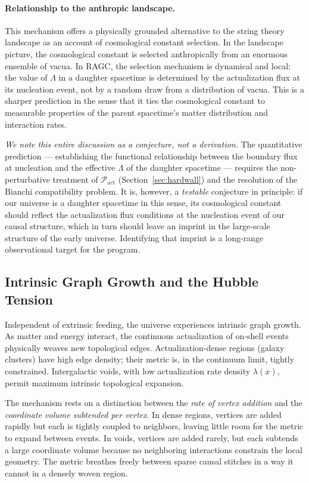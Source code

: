 \documentclass[11pt,a4paper]{article}
\theoremstyle{plain}
\theoremstyle{definition}
\theoremstyle{remark}
\newcommand{\Pact}{\mathcal{P}_{\mathrm{act}}}
\begin{document}
\paragraph{Relationship to the anthropic landscape.}
This mechanism offers a physically grounded alternative to the string theory
landscape as an account of cosmological constant selection. In the landscape
picture, the cosmological constant is selected anthropically from an enormous
ensemble of vacua. In RAGC, the selection mechanism is dynamical and local: the
value of $\Lambda$ in a daughter spacetime is determined by the actualization flux
at its nucleation event, not by a random draw from a distribution of vacua. This
is a sharper prediction in the sense that it ties the cosmological constant to
measurable properties of the parent spacetime's matter distribution and interaction
rates.

\emph{We note this entire discussion as a conjecture, not a derivation.} The
quantitative prediction --- establishing the functional relationship between the
boundary flux at nucleation and the effective $\Lambda$ of the daughter spacetime
--- requires the non-perturbative treatment of $\Pact$ (Section~\ref{sec:hardwall})
and the resolution of the Bianchi compatibility problem. It is, however, a
\emph{testable} conjecture in principle: if our universe is a daughter spacetime
in this sense, its cosmological constant should reflect the actualization flux
conditions at the nucleation event of our causal structure, which in turn should
leave an imprint in the large-scale structure of the early universe. Identifying
that imprint is a long-range observational target for the program.

\subsection{Intrinsic Graph Growth and the Hubble Tension}

Independent of extrinsic feeding, the universe experiences intrinsic graph growth.
As matter and energy interact, the continuous actualization of on-shell events
physically weaves new topological edges. Actualization-dense regions (galaxy
clusters) have high edge density; their metric is, in the continuum limit, tightly
constrained. Intergalactic voids, with low actualization rate density $\lambda(x)$,
permit maximum intrinsic topological expansion.

The mechanism rests on a distinction between the \emph{rate of vertex addition} and
the \emph{coordinate volume subtended per vertex}. In dense regions, vertices are
added rapidly but each is tightly coupled to neighbors, leaving little room for the
metric to expand between events. In voids, vertices are added rarely, but each
subtends a large coordinate volume because no neighboring interactions constrain
the local geometry. The metric breathes freely between sparse causal stitches in a
way it cannot in a densely woven region.
\end{document}
